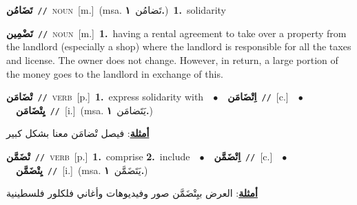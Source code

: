 \documentclass[10pt,a4paper,twoside]{article} %
\begin{document}
\begin{multicols}{2}
{\setlength\topsep{0pt}\textbf{\foreignlanguage{arabic}{تَضَامُن}}\ {\color{gray}\texttt{//}\color{black}}\ \textsc{noun}\ [m.]\ \color{gray}(msa. \foreignlanguage{arabic}{تَضامُن}~\foreignlanguage{arabic}{\textbf{١.}})\color{black}\ \textbf{1.}~solidarity\ } \vspace{2mm}

{\setlength\topsep{0pt}\textbf{\foreignlanguage{arabic}{تَضْمِين}}\ {\color{gray}\texttt{//}\color{black}}\ \textsc{noun}\ [m.]\ \textbf{1.}~having a rental agreement to take over a property from the landlord  (especially a shop) where the landlord is responsible for all the taxes and license. The owner does not change. However, in return, a large portion of the money goes to the landlord in exchange of this.\ } \vspace{2mm}

{\setlength\topsep{0pt}\textbf{\foreignlanguage{arabic}{تْضَامَن}}\ {\color{gray}\texttt{//}\color{black}}\ \textsc{verb}\ [p.]\ \textbf{1.}~express solidarity with\ \ $\bullet$\ \ \setlength\topsep{0pt}\textbf{\foreignlanguage{arabic}{اِتْضَامَن}}\ {\color{gray}\texttt{//}\color{black}}\ [c.]\ \ $\bullet$\ \ \setlength\topsep{0pt}\textbf{\foreignlanguage{arabic}{يِتْضَامَن}}\ {\color{gray}\texttt{//}\color{black}}\ [i.]\ \color{gray}(msa. \foreignlanguage{arabic}{يَتَضامَن}~\foreignlanguage{arabic}{\textbf{١.}})\color{black}\  \begin{flushright}\color{gray}\foreignlanguage{arabic}{\textbf{\underline{\foreignlanguage{arabic}{أمثلة}}}: فيصل تْضامَن معنا بشكل كبير}\end{flushright}\color{black}} \vspace{2mm}

{\setlength\topsep{0pt}\textbf{\foreignlanguage{arabic}{تْضَمَّن}}\ {\color{gray}\texttt{//}\color{black}}\ \textsc{verb}\ [p.]\ \textbf{1.}~comprise  \textbf{2.}~include\ \ $\bullet$\ \ \setlength\topsep{0pt}\textbf{\foreignlanguage{arabic}{اِتْضَمَّن}}\ {\color{gray}\texttt{//}\color{black}}\ [c.]\ \ $\bullet$\ \ \setlength\topsep{0pt}\textbf{\foreignlanguage{arabic}{يِتْضَمَّن}}\ {\color{gray}\texttt{//}\color{black}}\ [i.]\ \color{gray}(msa. \foreignlanguage{arabic}{يَتَضَمَّن}~\foreignlanguage{arabic}{\textbf{١.}})\color{black}\  \begin{flushright}\color{gray}\foreignlanguage{arabic}{\textbf{\underline{\foreignlanguage{arabic}{أمثلة}}}: العرض بيِتْضَمَّن صور وفيديوهات وأغاني فلكلور فلسطينية}\end{flushright}\color{black}} \vspace{2mm}


\end{multicols}
\end{document}
